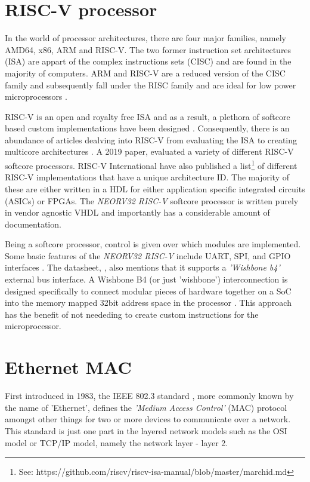 \section{RISC-V processor}
In the world of processor architectures, there are four major families, namely AMD64, x86, ARM and RISC-V. The two former instruction set architectures (ISA) 
are appart of the complex instructions sets (CISC) and are found in the majority of computers. ARM and RISC-V are a reduced version of the CISC family and 
subsequently fall under the RISC family and are ideal for low power microprocessors \cite{RV16Embedded}.

RISC-V is an open and royalty free ISA and as a result, a plethora of softcore based custom implementations have been designed \cite{CatalogRISCSoftcore}. 
Consequently, there is an abundance of articles dealving into RISC-V from evaluating the ISA \cite{InvestigatingRiscv} to creating multicore architectures
\cite{RiscVMulticore}. A 2019 paper, \cite{CatalogRISCSoftcore} evaluated a variety of different RISC-V softcore processors. RISC-V International have 
also published a list\footnote[1]{See: https://github.com/riscv/riscv-isa-manual/blob/master/marchid.md} of different RISC-V implementations 
that have a unique architecture ID. The majority of these are either written in a HDL for either application specific integrated circuits (ASICs) or FPGAs.
The \textit{NEORV32 RISC-V} softcore processor is written purely in vendor agnostic VHDL and importantly has a considerable amount of documentation. 

Being a softcore processor, control is given over which modules are implemented. Some basic features of the \textit{NEORV32 RISC-V} include 
UART, SPI, and GPIO interfaces \cite{neorv32Datasheet}. The datasheet, \cite{neorv32Datasheet}, also mentions that it supports a \textit{'Wishbone b4'} 
external bus interface. A Wishbone B4 (or just 'wishbone') interconnection is designed specifically to connect modular pieces of hardware together on a 
SoC into the memory mapped 32bit address space in the processor \cite{WishboneSpec}. This approach has the benefit of not neededing to create custom 
instructions for the microprocessor. 

\newpage

\section{Ethernet MAC}

First introduced in 1983, the IEEE 802.3 standard \cite{IEEE802.3-2012}, more commonly known by the name of 'Ethernet', defines the \textit{'Medium Access Control'} 
(MAC) protocol amongst other things for two or more devices to communicate over a network. This standard is just one part in the layered network 
models such as the OSI model or TCP/IP model, namely the network layer - layer 2. 


